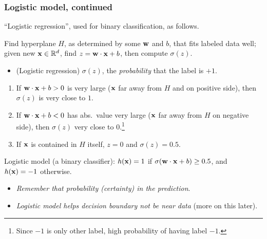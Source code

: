 \documentclass{beamer}
\theoremstyle{example}
\begin{document}
\begin{frame}
\frametitle{Logistic model, continued}
    ``Logistic regression'', used for binary classification, as follows.
    
    Find hyperplane $H$, as determined by some ${\bf w}$ and $b$, that fits labeled data well; given new ${\bf x}\in\mathbb R^d$, find $z = {\bf w}\cdot{\bf x}+b$, then compute $\sigma(z)$. 
    \pause
    \begin{itemize}
        \item (Logistic regression) $\sigma(z)$, the \textit{probability} that the label is $+1$.
    \end{itemize}
    
    \pause
    \begin{enumerate}
        \item If ${\bf w}\cdot{\bf x}+b > 0$ is very large (${\bf x}$ far away from $H$ and on positive side), then  $\sigma(z)$ is very close to $1$.
        \pause
        \item If ${\bf w}\cdot{\bf x}+b < 0$ has abs.\ value very large (${\bf x}$ far away from $H$ on negative side), then  $\sigma(z)$ very close to $0$.\footnote{Since $-1$ is only other label, high probability of having label $-1$.}
        \pause
        \item If ${\bf x}$ is contained in $H$ itself, $z=0$ and $\sigma(z) = 0.5$.
    \end{enumerate}
    \pause
    Logistic model (a binary classifier): $h({\bf x})=1$ if $\sigma({\bf w}\cdot{\bf x}+b) \ge 0.5$, and $h({\bf x})=-1$ otherwise. 
    \begin{itemize}
        \item \textit{Remember that probability (certainty) in the prediction}.
        \pause 
        \item \textit{Logistic model helps decision boundary not be near data} (more on this later).
    \end{itemize}

\end{frame}
\end{document}
